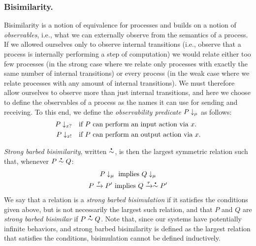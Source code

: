 \documentclass[runningheads]{llncs}
\begin{document}

\subsubsection{Bisimilarity.}
Bisimilarity is a notion of equivalence for processes and
builds on a notion of \emph{observables}, i.e., what we can externally
observe from the semantics of a process. If we allowed ourselves only to observe
internal transitions (i.e., observe that a process is internally
performing a step of computation) we would relate either too few
processes (in the strong case where we relate only processes with
exactly the same number of internal transitions) or every process (in
the weak case where we relate processes with any amount of internal
transitions).  We must therefore allow ourselves to observe more than
just internal transitions, and here we choose to define the observables
of a process as the names it can use for sending and receiving.
To this end, we define the \emph{observability predicate}
\( P\downarrow_{\mu} \) as follows:
\begin{align*}
  P\downarrow_{x?}  &\quad \textrm{if \( P \) can perform an input action via \( x \).} \\
  P\downarrow_{x!} &\quad \textrm{if \( P \) can perform an output action via \( x \).}
\end{align*}

\emph{Strong barbed bisimilarity}, written \( \sbbisim{}{} \), is then the largest symmetric relation such that, whenever \( \sbbisim{P}{Q} \):
\begin{gather*}
  \observable{P}{\mu}~\textrm{implies}~\observable{Q}{\mu} \\%
  \transition{P}{\Atau}{P'}~\textrm{implies}~\transition{Q}{\Atau}{\sbbisim{}{} P'} %
\end{gather*}
We say that a relation is a \emph{strong barbed bisimulation} if it satisfies the conditions given above, but is not necessarily the largest such relation, and that \( P \) and \( Q \) are \emph{strong barbed bisimilar} if \( \sbbisim{P}{Q} \).
Note that, since our systems have potentially infinite behaviors, and strong barbed bisimilarity is defined as the largest relation that satisfies the conditions, bisimulation cannot be defined inductively.
\end{document}
